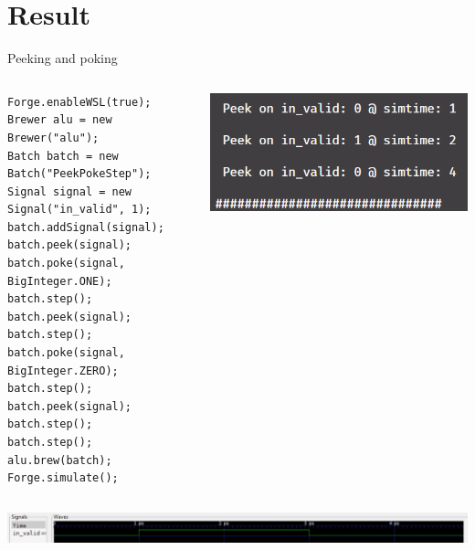 \documentclass[aspectratio=169, handout]{beamer}
\begin{document}
\section{Result}
\begin{frame}[containsverbatim]{Peeking and poking}
    \begin{columns}
        \begin{column}{.45\textwidth}
            \begin{verbatim}
Forge.enableWSL(true);
Brewer alu = new Brewer("alu");
Batch batch = new Batch("PeekPokeStep");
Signal signal = new Signal("in_valid", 1);
batch.addSignal(signal);
batch.peek(signal);
batch.poke(signal, BigInteger.ONE);
batch.step();
batch.peek(signal);
batch.step();
batch.poke(signal, BigInteger.ZERO);
batch.step();
batch.peek(signal);
batch.step();
batch.step();
alu.brew(batch);
Forge.simulate();
            \end{verbatim}
        \end{column}
        \begin{column}{.45\textwidth}
            \includegraphics[width=\columnwidth]{graphics/peekpokestep.png}
        \end{column}
    \end{columns}
    \begin{center}
        \includegraphics[width=.9\columnwidth]{graphics/peekpokestepWave.png}
    \end{center}
\end{frame}
\end{document}
